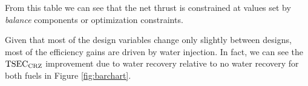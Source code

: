 \documentclass[conf]{new-aiaa}
\begin{document}
From this table we can see that the net thrust is constrained at values set by \emph{balance} components or optimization constraints.


Given that most of the design variables change only slightly between designs, most of the efficiency gains are driven by water injection.
In fact, we can see the $\rm{TSEC}_{\rm{CRZ}}$ improvement due to water recovery relative to no water recovery for both fuels in Figure \ref{fig:barchart}.
\end{document}
